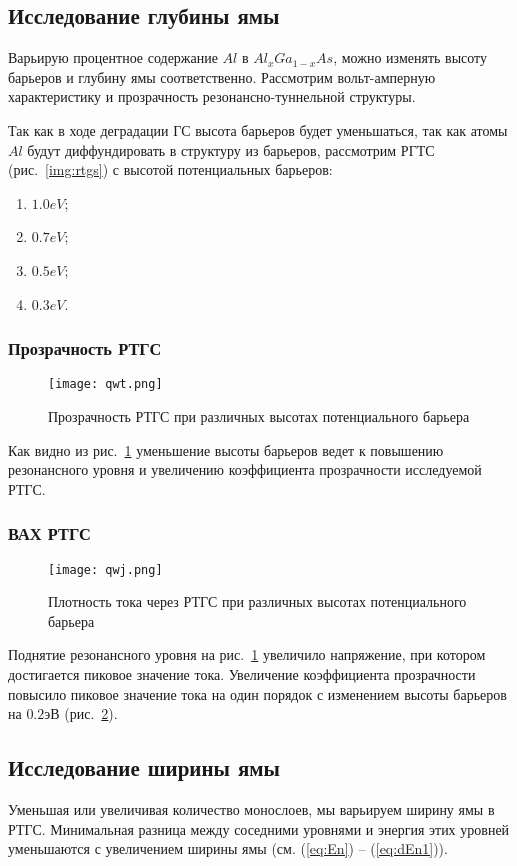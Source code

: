 \subsection{Исследование глубины ямы}
Варьирую процентное содержание $Al$ в $Al_{x}Ga_{1-x}As$, можно изменять высоту барьеров и глубину ямы соответственно. Рассмотрим вольт-амперную характеристику и прозрачность резонансно-туннельной структуры.

Так как в ходе деградации ГС высота барьеров будет уменьшаться, так как атомы $Al$ будут диффундировать в структуру из барьеров, рассмотрим РГТС (рис.~\ref{img:rtgs}) с высотой потенциальных барьеров:
\begin{enumerate}
	\item $1.0 eV$;
	\item $0.7 eV$;
	\item $0.5 eV$;
	\item $0.3 eV$.
\end{enumerate}

\subsubsection{Прозрачность РТГС}
\begin{figure}[h]
	\centering
	\texttt{[image: qwt.png]}
	\caption{Прозрачность РТГС при различных высотах потенциального барьера}
	\label{fig:qwt}
\end{figure}

Как видно из рис.~\ref{fig:qwt} уменьшение высоты барьеров ведет к повышению резонансного уровня и увеличению коэффициента прозрачности исследуемой РТГС. 

\subsubsection{ВАХ РТГС}
\begin{figure}[h]
	\centering
	\texttt{[image: qwj.png]}
	\caption{Плотность тока через РТГС при различных высотах потенциального барьера}
	\label{fig:qwj}
\end{figure}

Поднятие резонансного уровня на рис.~\ref{fig:qwt} увеличило напряжение, при котором достигается пиковое значение тока. Увеличение коэффициента прозрачности повысило пиковое значение тока на один порядок с изменением высоты барьеров на $0.2$эВ (рис.~\ref{fig:qwj}).

\subsection{Исследование ширины ямы}
Уменьшая или увеличивая количество монослоев, мы варьируем ширину ямы в РТГС. Минимальная разница между соседними уровнями и энергия этих уровней уменьшаются с увеличением ширины ямы (см. (\ref{eq:En}) -- (\ref{eq:dEn1})).

